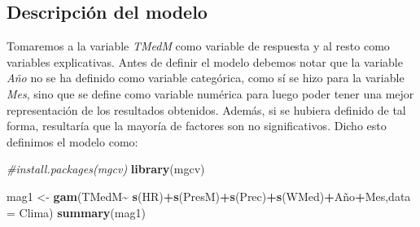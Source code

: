 \documentclass[12pt,a4paper,]{book}
\newenvironment{Shaded}{\begin{snugshade}}{\end{snugshade}}
\newcommand{\AttributeTok}[1]{\textcolor[rgb]{0.13,0.29,0.53}{#1}}
\newcommand{\CommentTok}[1]{\textcolor[rgb]{0.56,0.35,0.01}{\textit{#1}}}
\newcommand{\FunctionTok}[1]{\textcolor[rgb]{0.13,0.29,0.53}{\textbf{#1}}}
\newcommand{\NormalTok}[1]{#1}
\newcommand{\OtherTok}[1]{\textcolor[rgb]{0.56,0.35,0.01}{#1}}
\newcommand{\SpecialCharTok}[1]{\textcolor[rgb]{0.81,0.36,0.00}{\textbf{#1}}}
\numberwithin{dummy}{section}
\theoremstyle{ocrenumbox}
\theoremstyle{blacknumex}
\theoremstyle{blacknumbox}
\theoremstyle{ocrenum}
\theoremstyle{ocrenum}
\begin{document}
\hypertarget{descripciuxf3n-del-modelo}{%
\subsection{Descripción del modelo}\label{descripciuxf3n-del-modelo}}

Tomaremos a la variable \emph{TMedM} como variable de respuesta y al
resto como variables explicativas. Antes de definir el modelo debemos
notar que la variable \emph{Año} no se ha definido como variable
categórica, como sí se hizo para la variable \emph{Mes}, sino que se
define como variable numérica para luego poder tener una mejor
representación de los resultados obtenidos. Además, si se hubiera
definido de tal forma, resultaría que la mayoría de factores son no
significativos. Dicho esto definimos el modelo como:

\begin{Shaded}
\begin{Highlighting}[]
\CommentTok{\#install.packages(\textquotesingle{}mgcv\textquotesingle{})}
\FunctionTok{library}\NormalTok{(mgcv)}
\end{Highlighting}
\end{Shaded}

\begin{Shaded}
\begin{Highlighting}[]
\NormalTok{mag1 }\OtherTok{\textless{}{-}} \FunctionTok{gam}\NormalTok{(TMedM}\SpecialCharTok{\textasciitilde{}} \FunctionTok{s}\NormalTok{(HR)}\SpecialCharTok{+}\FunctionTok{s}\NormalTok{(PresM)}\SpecialCharTok{+}\FunctionTok{s}\NormalTok{(Prec)}\SpecialCharTok{+}\FunctionTok{s}\NormalTok{(WMed)}\SpecialCharTok{+}\NormalTok{Año}\SpecialCharTok{+}\NormalTok{Mes,}\AttributeTok{data =}\NormalTok{ Clima)}
\FunctionTok{summary}\NormalTok{(mag1)}
\end{Highlighting}
\end{Shaded}
\end{document}
